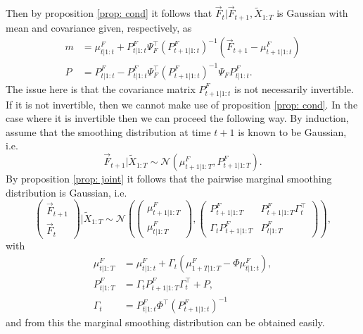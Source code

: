 Then by proposition \ref{prop: cond} it follows that $\vec{F}_{t} \vert \vec{F}_{t+1}, \tilde{X}_{1:T}$ is Gaussian with mean and covariance given, respectively, as
\begin{align}
	m &= \mu_{t | 1:t}^F + P_{t | 1:t}^F \Psi_{F}^{\top} \left( P_{t+1 | 1:t}^F \right)^{-1} \left( \vec{F}_{t+1} - \mu_{t+1 | 1:t}^F \right) \\
	P &= P_{t | 1:t}^F - P_{t | 1:t}^F \Psi_{F}^{\top} \left( P_{t+1 | 1:t}^F \right)^{-1} \Psi_{F} P_{t | 1:t}^F.
\end{align}
The issue here is that the covariance matrix $P_{t+1 | 1:t}^F$ is not necessarily invertible. If it is not invertible, then we cannot make use of proposition \ref{prop: cond}. In the case where it is invertible then we can proceed the following way.
By induction, assume that the smoothing distribution at time $t+1$ is known to be Gaussian, i.e. 
$$\vec{F}_{t+1} \vert \tilde{X}_{1:T} \sim \mathcal N \left( \mu_{t+1 | 1:T}^F, P_{t+1 | 1:T}^F \right).$$
By proposition \ref{prop: joint} it follows that the pairwise marginal smoothing distribution is Gaussian, i.e.
\begin{equation}
	\begin{pmatrix} \vec{F}_{t+1} \\ \vec{F}_{t} \end{pmatrix} 
	\vert \tilde{X}_{1:T} \sim 
	\mathcal N \left( \begin{pmatrix} \mu_{t+1 | 1:T}^F \\ \mu_{t | 1:T}^F \end{pmatrix},
	\begin{pmatrix} 
		P_{t+1 | 1:T}^F & P_{t+1 | 1:T}^F \Gamma_{t}^{\top} \\ 
		\Gamma_{t} P_{t+1 | 1:T}^F & P_{t | 1:T}^F
	\end{pmatrix} \right),
\end{equation}
with 
\begin{equation}
	\begin{aligned}
		\mu_{t | 1:T}^F &= \mu_{t | 1:t}^F + \Gamma_{t} \left( \mu_{1+T | 1:T}^F - \Phi \mu_{t | 1:t}^F \right), \\
		P_{t | 1:T}^F &= \Gamma_{t} P_{t+1 | 1:T}^F  \Gamma_{t}^{\top} + P, \\
		\Gamma_{t} &= P_{t | 1:t}^F \Phi^{\top} \left( P_{t+1 | 1:t}^F \right)^{-1}
	\end{aligned}
\end{equation}
and from this the marginal smoothing distribution can be obtained easily.

